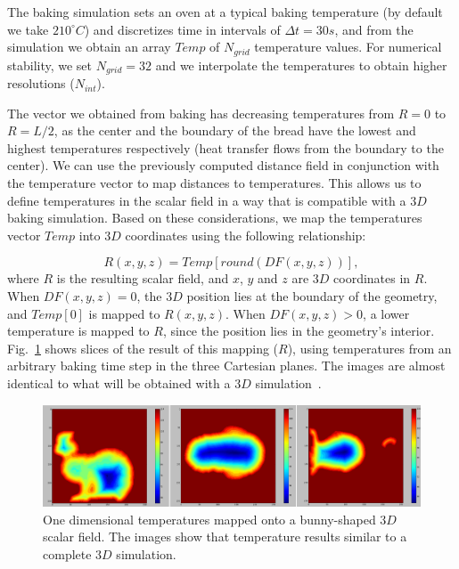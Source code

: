 The baking simulation sets an oven at a typical baking temperature (by default we take $210^{\circ}C$) and discretizes time in intervals of $\Delta t = 30s$, and from the simulation we obtain an array $Temp$ of $N_{grid}$ temperature values. 
For numerical stability, we set $N_{grid}=32$ and we interpolate the temperatures to obtain higher resolutions ($N_{int}$). 

The vector we obtained from baking has decreasing temperatures from $R = 0$ to $R = L/2$, as the center and the boundary of the bread have the lowest and highest temperatures respectively (heat transfer flows from the boundary to the center). 
We can use the previously computed distance field in conjunction with the temperature vector to map distances to temperatures. 
This allows us to define temperatures in the scalar field in a way that is compatible with a $3D$ baking simulation. Based on these considerations, we map the temperatures vector $Temp$ into $3D$ coordinates using the following relationship:

\begin{equation*}
\displaystyle R(x,y,z) = Temp[ round( DF(x,y,z) ) ], 
\end{equation*}
%
where $R$ is the resulting scalar field, and $x$, $y$ and $z$ are $3D$ coordinates in $R$. When $DF(x,y,z) = 0$, the $3D$ position lies at the boundary of the geometry, and $Temp[0]$ is mapped to $R(x,y,z)$. 
When $DF(x,y,z) > 0$, a lower temperature is mapped to $R$, since the position lies in the geometry's interior. 
Fig.~\ref{fg:baking} shows slices of the result of this mapping ($R$), using temperatures from an arbitrary baking time step in the three Cartesian planes. 
The images are almost identical to what will be obtained with a $3D$ simulation~\cite{Purlis2010}.

\begin{figure}
\includegraphics[width=13cm]{figures/tempsbunny}
\caption{One dimensional temperatures mapped onto a bunny-shaped $3D$ scalar field. The images show that temperature results similar to a complete $3D$ simulation.}
\label{fg:baking}
\end{figure}

